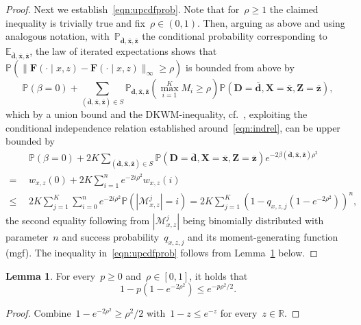 \documentclass[11pt, a4paper]{article}
\newcommand{\R}{\mathbb{R}}
\theoremstyle{definition}
\newtheorem{lemma}[theorem]{Lemma}
\begin{document}
\begin{proof}
Next we establish~\eqref{eqn:upcdfprob}. Note that for~$\rho \geq 1$ the claimed inequality is trivially true and fix~$\rho \in (0, 1)$. Then, arguing as above and using analogous notation, with~$\mathbb{P}_{\overline {\bm d}, \overline {\bm x},  \overline {\bm z}}$ the conditional probability corresponding to~$\mathbb{E}_{\overline {\bm d}, \overline {\bm x},  \overline {\bm z}}$, the law of iterated expectations shows that~$\mathbb{P}(\| \hat{\bm{F}}(\cdot \mid x, z) - \bm{F}(\cdot\mid x, z)\|_{\infty} \geq \rho )$ is bounded from above by
%
\begin{equation}\label{eqn:pbd}
\mathbb{P}\left(\beta = 0\right) +  \sum_{(\overline{\bm{d}}, \overline{\bm{x}}, \overline{\bm{z}}) \in S} \mathbb{P}_{\overline {\bm d}, \overline {\bm x},  \overline {\bm z}} \left ( \max_{i = 1}^K M_i \geq \rho \right) \mathbb{P}(\bm D = \overline{\bm{d}}, \bm{X} = \overline{\bm{x}}, \bm{Z} = \overline{\bm{z}}),
\end{equation}
which by a union bound and the DKWM-inequality, cf.~\cite{massart1990}, exploiting the conditional independence relation established around~\eqref{eqn:indrel}, can be upper bounded by
%
\begin{align*}
& ~~\mathbb{P}\left(\beta = 0\right) + 2  K \sum_{(\overline{\bm{d}}, \overline{\bm{x}}, \overline{\bm{z}}) \in S} \mathbb{P}(\bm D = \overline{\bm{d}}, \bm{X} = \overline{\bm{x}}, \bm{Z} = \overline{\bm{z}})  e^{-2\beta(\overline{\bm{d}}, \overline{\bm{x}}, \overline{\bm{z}}) \rho^2}  \\
=&  ~~ w_{x, z}(0) + 2 K\sum_{i = 1}^n e^{-2 i \rho^2} w_{x, z}(i) \\
\leq&  ~~ 2K\sum_{j = 1}^K \sum_{i = 0}^n e^{-2 i \rho^2} \mathbb{P}(|\mathcal{M}^j_{x, z}| = i) = 2K \sum_{j = 1}^K (1-q_{x, z, j}(1-e^{-2\rho^2}))^n,
\end{align*}
%
the second equality following from $|\mathcal{M}_{x,z}^j|$ being binomially distributed with parameter~$n$ and success probability~$q_{x, z, j}$ and its moment-generating function (mgf). The inequality in~\eqref{eqn:upcdfprob} follows from Lemma~\ref{lem:auxinL} below.
\end{proof}
%
\begin{lemma}\label{lem:auxinL}
For every~$p \geq 0$ and~$\rho \in [0, 1]$, it holds that~$$1-p(1-e^{-2\rho^2}) \leq e^{-p\rho^2/2}.$$
\end{lemma}
%
\begin{proof}
Combine~$1 - e^{-2\rho^2} \geq \rho^2/2$ with~$1-z \leq e^{-z}$ for every~$z \in \R$.
\end{proof}
\end{document}
